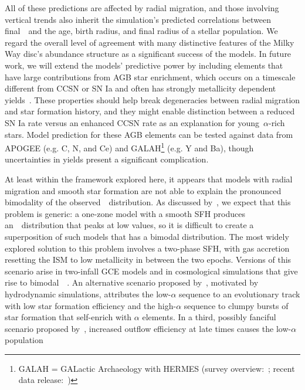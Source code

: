 \documentclass[draft2.tex]{subfiles}
\begin{document}
All of these predictions are affected by radial migration, and those involving 
vertical trends also inherit the simulation's predicted correlations between 
final~\absz~and the age, birth radius, and final radius of a stellar 
population. 
We regard the overall level of agreement with many distinctive features of the 
Milky Way disc's abundance structure as a significant success of the models. 
{\color{red} 
In future work, we will extend the models' predictive power by including 
elements that have large contributions from AGB star enrichment, which occurs 
on a timescale different from CCSN or SN Ia and often has strongly 
metallicity dependent yields~\citep[e.g.][]{Cristallo2011, Cristallo2015}. 
These properties should help break degeneracies between radial migration and 
star formation history, and they might enable distinction between a reduced 
SN Ia rate versus an enhanced CCSN rate as an explanation for 
young~$\alpha$-rich stars. 
Model prediction for these AGB elements can be tested against data from 
APOGEE (e.g. C, N, and Ce) and GALAH\footnote{
	GALAH = GALactic Archaeology with HERMES 
	(survey overview:~\citealp{Martell2017}; 
	recent data release:~\citealp{Buder2021}) 
} (e.g. Y and Ba), though uncertainties in yields present a significant 
complication.
} 
\par 
At least within the framework explored here, it appears that models 
with radial migration and smooth star formation are not able to explain the 
pronounced bimodality of the observed~\afe~distribution. 
As discussed by~\citet{Vincenzo2021a}, we expect that this problem is generic: 
a one-zone model with a smooth SFH produces an~\afe~distribution that peaks at 
low values, so it is difficult to create a superposition of such models that 
has a bimodal distribution. 
The most widely explored solution to this problem involves a two-phase SFH, 
with gas accretion resetting the ISM to low metallicity in between the two 
epochs. 
Versions of this scenario arise in two-infall GCE models 
\citep[e.g.][]{Chiappini1997, Spitoni2019a, Khoperskov2021} and in cosmological 
simulations that give rise to bimodal~\afe~\citep{Mackereth2018, Grand2018, 
Buck2020b}. 
An alternative scenario proposed by~\citet{Clarke2019}, motivated by 
hydrodynamic simulations, attributes the low-$\alpha$ sequence to an 
evolutionary track with low star formation efficiency and the high-$\alpha$ 
sequence to clumpy bursts of star formation that self-enrich with $\alpha$ 
elements. 
In a third, possibly fanciful scenario proposed by~\citet{Weinberg2017}, 
increased outflow efficiency at late times causes the low-$\alpha$ population 
\end{document}
